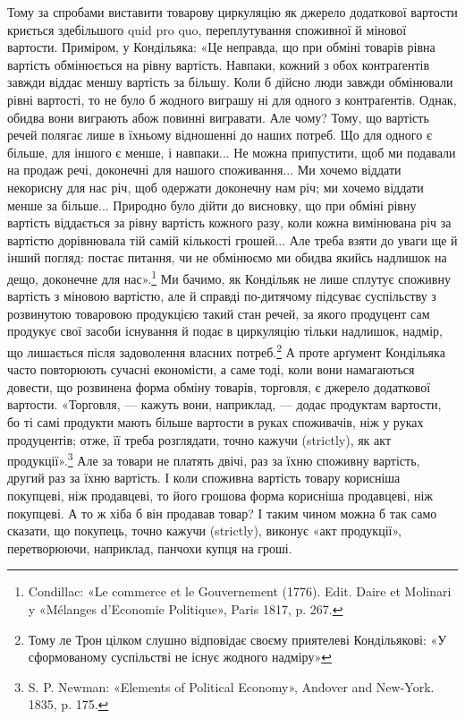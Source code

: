 Тому за спробами виставити товарову циркуляцію як джерело
додаткової вартости криється здебільшого quid pro quo, переплутування
споживної й мінової вартости. Приміром, у Кондільяка:
«Це неправда, що при обміні товарів рівна вартість обмінюється
на рівну вартість. Навпаки, кожний з обох контраґентів завжди
віддає меншу вартість за більшу. Коли б дійсно люди завжди
обмінювали рівні вартості, то не було б жодного виграшу ні для
одного з контраґентів. Однак, обидва вони виграють абож повинні
вигравати. Але чому? Тому, що вартість речей полягає
лише в їхньому відношенні до наших потреб. Що для одного є
більше, для іншого є менше, і навпаки... Не можна припустити,
щоб ми подавали на продаж речі, доконечні для нашого споживання...
Ми хочемо віддати некорисну для нас річ, щоб одержати
доконечну нам річ; ми хочемо віддати менше за більше... Природно
було дійти до висновку, що при обміні рівну вартість віддається
за рівну вартість кожного разу, коли кожна вимінювана
річ за вартістю дорівнювала тій самій кількості грошей... Але
треба взяти до уваги ще й інший погляд: постає питання, чи не
обмінюємо ми обидва якийсь надлишок на дещо, доконечне для
нас».\footnote{
Condillac: «Le commerce et le Gouvernement (1776). Edit. Daire
et Molinari y «Mélanges d’Economie Politique», Paris 1817, p. 267.
} Ми бачимо, як Кондільяк не лише сплутує споживну
вартість з міновою вартістю, але й справді по-дитячому підсуває
суспільству з розвинутою товаровою продукцією такий стан речей,
за якого продуцент сам продукує свої засоби існування й подає
в циркуляцію тільки надлишок, надмір, що лишається після
задоволення власних потреб.\footnote{
Тому ле Трон цілком слушно відповідає своєму приятелеві Кондільякові:
«У сформованому суспільстві не існує жодного надміру»
} А проте арґумент Кондільяка
часто повторюють сучасні економісти, а саме тоді, коли вони
намагаються довести, що розвинена форма обміну товарів, торговля,
є джерело додаткової вартости. «Торговля, — кажуть вони,
наприклад, — додає продуктам вартости, бо ті самі продукти
мають більше вартости в руках споживачів, ніж у руках продуцентів;
отже, її треба розглядати, точно кажучи (strictly), як
акт продукції».\footnote{
S. P. Newman: «Elements of Political Economy», Andover and
New-York. 1835, p. 175.
} Але за товари не платять двічі, раз за їхню
споживну вартість, другий раз за їхню вартість. І коли споживна
вартість товару корисніша покупцеві, ніж продавцеві, то його
грошова форма корисніша продавцеві, ніж покупцеві. А то ж
хіба б він продавав товар? І таким чином можна б так само сказати,
що покупець, точно кажучи (strictly), виконує «акт продукції»,
перетворюючи, наприклад, панчохи купця на гроші.

